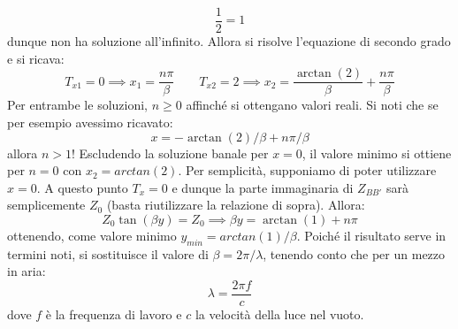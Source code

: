 \documentclass{book}
\begin{document}
         \begin{equation}
            \frac{1}{2} = 1
         \end{equation}
         dunque non ha soluzione all'infinito.
         Allora si risolve l'equazione di secondo grado e si ricava:
         \begin{equation}
            T_{x1} = 0 \implies x_{1} = \frac{n \pi}{\beta} \qquad T_{x2} = 2 \implies x_{2} = \frac{\arctan(2)}{\beta}+\frac{n\pi}{\beta}
         \end{equation}
         Per entrambe le soluzioni, $n\geq 0$ affinché si ottengano valori reali. Si noti che se per esempio avessimo ricavato:
         \begin{equation}
            x = -\arctan(2)/\beta +n \pi/\beta
         \end{equation}
         allora $n>1$! Escludendo la soluzione banale per $x=0$, il valore minimo si ottiene per $n=0$ con $x_{2}=arctan(2)$.
         Per semplicità, supponiamo di poter utilizzare $x=0$. A questo punto $T_{x}=0$ e dunque la parte immaginaria di $Z_{BB'}$ sarà semplicemente $Z_{0}$ (basta riutilizzare
         la relazione di sopra). Allora:
         \begin{equation}
            Z_{0}\tan(\beta y) = Z_{0} \implies \beta y = \arctan(1)+n \pi 
         \end{equation}
         ottenendo, come valore minimo $y_{min} = arctan(1)/\beta$.
         Poiché il risultato serve in termini noti, si sostituisce il valore di $\beta = 2\pi /\lambda$, tenendo 
         conto che per un mezzo in aria:
         \begin{equation}
            \lambda = \frac{2\pi f}{c}
         \end{equation}
         dove $f$ è la frequenza di lavoro e $c$ la velocità della luce nel vuoto.
    \newpage
\end{document}
